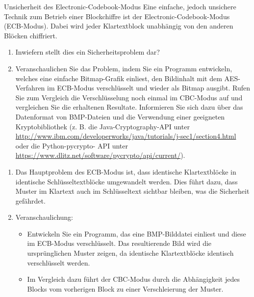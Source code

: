 \documentclass{article}
\begin{document}
\setcounter{subsection}{40}
\begin{exercise}{Unsicherheit des Electronic-Codebook-Modus}
  Eine einfache, jedoch unsichere Technik zum Betrieb einer Blockchiffre ist der Electronic-Codebook-Modus
  (ECB-Modus). Dabei wird jeder Klartextblock unabhängig von den anderen Blöcken chiffriert.
  \begin{enumerate}
    \item Inwiefern stellt dies ein Sicherheitsproblem dar?
    \item Veranschaulichen Sie das Problem, indem Sie ein Programm entwickeln, welches eine einfache Bitmap-Grafik einliest, den Bildinhalt mit dem AES-Verfahren im ECB-Modus verschlüsselt und wieder als Bitmap ausgibt. Rufen Sie zum Vergleich die Verschlüsselung noch einmal im CBC-Modus auf und vergleichen Sie die erhaltenen Resultate. Informieren Sie sich dazu über das Datenformat von BMP-Dateien und die Verwendung einer geeigneten Kryptobibliothek (z. B. die Java-Cryptography-API unter \url{http://www.ibm.com/developerworks/java/tutorials/j-sec1/section4.html} oder die Python-pycrypto- API unter \url{https://www.dlitz.net/software/pycrypto/api/current/}).
  \end{enumerate}

  \begin{solution}
    \begin{enumerate}
        \item Das Hauptproblem des ECB-Modus ist, dass identische Klartextblöcke in identische Schlüsseltextblöcke umgewandelt werden. Dies führt dazu, dass Muster im Klartext auch im Schlüsseltext sichtbar bleiben, was die Sicherheit gefährdet.
        \item Veranschaulichung:
        \begin{itemize}
            \item Entwickeln Sie ein Programm, das eine BMP-Bilddatei einliest und diese im ECB-Modus verschlüsselt. Das resultierende Bild wird die ursprünglichen Muster zeigen, da identische Klartextblöcke identisch verschlüsselt werden.
            \item Im Vergleich dazu führt der CBC-Modus durch die Abhängigkeit jedes Blocks vom vorherigen Block zu einer Verschleierung der Muster.
        \end{itemize}
    \end{enumerate}
  \end{solution}
\end{exercise}
\end{document}
